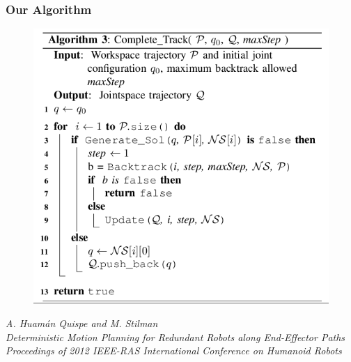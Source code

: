 \documentclass[10pt]{beamer}
\begin{document}
\begin{frame}
\frametitle{Our Algorithm}

\begin{figure}[h] 
   \includegraphics[scale=0.3]{images/algorithmCompleteTrack.png} 
   \label{fig:Algorithm}
\end{figure}

\begin{scriptsize}
\textit{A. Huam\'{a}n Quispe and M. Stilman \\}
\textit{Deterministic Motion Planning for Redundant Robots along End-Effector Paths \\}
\textit{Proceedings of 2012 IEEE-RAS International Conference on Humanoid Robots}
\end{scriptsize}

\end{frame}
\end{document}
